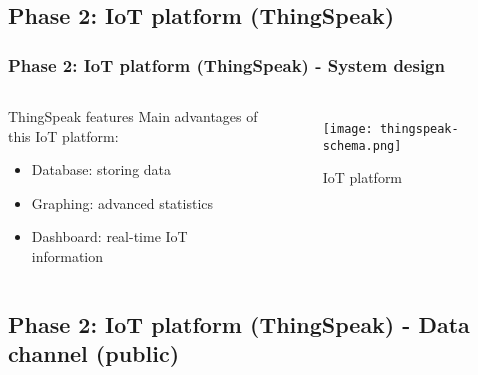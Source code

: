 \documentclass[
    aspectratio=169,                   %
]{beamer}
\begin{document}
\subsection{Phase 2: IoT platform (ThingSpeak)}

    \begin{frame}
        \frametitle{Phase 2: IoT platform (ThingSpeak) - System design}

        \begin{columns}[T,onlytextwidth]
              \begin{block}{ThingSpeak\cite{thingspeakchannel} features}
                Main advantages of this IoT platform:
                \begin{itemize}
                    \item \alert{Database}: storing data
                    \item \alert{Graphing}: advanced statistics
                    \item \alert{Dashboard}: real-time IoT information
                \end{itemize}
              \end{block}
            \begin{figure}
                \centering
                \begin{stampbox}
                    \texttt{[image: thingspeak-schema.png]}
                \end{stampbox}
                \caption{IoT platform}
            \end{figure}       
        \end{columns}

    \end{frame}

\subsection{Phase 2: IoT platform (ThingSpeak) - Data channel (public)}
\end{document}
